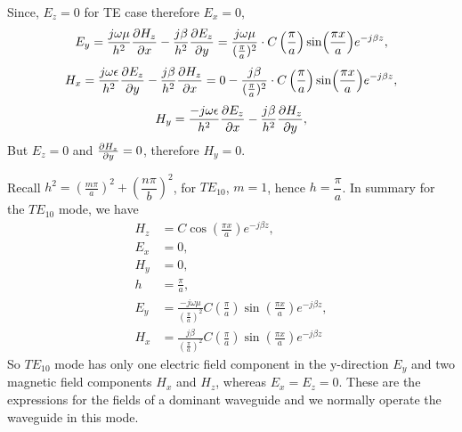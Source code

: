 Since, $E_z = 0$ for TE case therefore $E_x = 0$,
\begin{dmath*}
E_y = \frac{j\omega\mu}{h^2}\pdv{ H_z}{x} - \frac{j\beta}{h^2}\pdv{E_z}{y} = \frac{j\omega\mu}{(\frac{\pi}{a})^2} \cdot C\left(\frac{\pi}{a}\right)\sin(\frac{\pi x}{a})e^{-j\beta z},
\end{dmath*} 
\begin{dmath*}
H_x = \frac{j\omega\epsilon}{h^2}\pdv{E_z}{y} - \frac{j\beta}{h^2}\pdv{H_z}{x}= 0 - \frac{j\beta}{(\frac{\pi}{a})^2} \cdot C\left(\frac{\pi}{a}\right)\sin(\frac{\pi x}{a})e^{-j\beta z},
\end{dmath*}
\begin{dmath*}
H_y = \frac{-j\omega\epsilon}{h^2}\pdv{E_z}{x} -  \frac{j\beta}{h^2}\pdv{H_z}{y}, 
\end{dmath*}
But $E_z = 0$ and $\pdv{H_z}{y} = 0$, therefore $H_y = 0$. 

Recall $h^2 =\left(\frac{m\pi}{a}\right)^2 + \left(\dfrac{n\pi}{b}\right)^2$,  for $TE_{10}$, $m = 1$, hence $h = \dfrac{\pi}{a}$. In summary for the $TE_{10}$ mode, we have 
\begin{align}
H_z &= C\cos(\frac{\pi x}{a})e^{-j\beta z},\\
E_x &= 0,\\
H_y &= 0,\\
h &= \frac{\pi}{a},\\
E_y &=\frac{-j\omega\mu }{(\frac{\pi}{a})^2}C\left(\frac{\pi}{a}\right)\sin(\frac{\pi x}{a})e^{-j\beta z},\\ 
H_x &= \frac{j\beta}{(\frac{\pi}{a})^2}C\left(\frac{\pi}{a}\right)\sin(\frac{\pi x}{a})e^{-j\beta z} 
\end{align}
So $TE_{10}$ mode has only one electric field component in the y-direction $E_y$ and two magnetic field components $H_x$ and $H_z$, whereas $E_x = E_z = 0$. These are the expressions for the fields of a dominant waveguide and we normally operate the waveguide in this mode.

